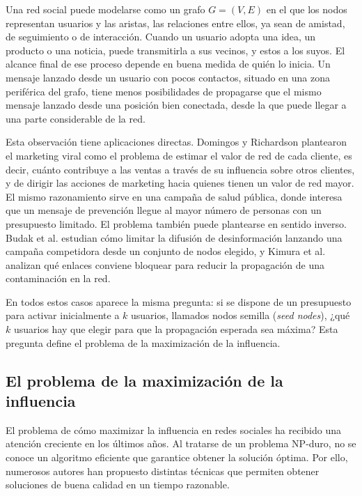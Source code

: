 \documentclass[12pt,twoside,titlepage]{report}
\begin{document}
Una red social puede modelarse como un grafo $G=(V,E)$ en el que los nodos representan usuarios y las aristas, las relaciones entre ellos, ya sean de amistad, de seguimiento o de interacción.
Cuando un usuario adopta una idea, un producto o una noticia, puede transmitirla a sus vecinos, y estos a los suyos.
El alcance final de ese proceso depende en buena medida de quién lo inicia.
Un mensaje lanzado desde un usuario con pocos contactos, situado en una zona periférica del grafo, tiene menos posibilidades de propagarse que el mismo mensaje lanzado desde una posición bien conectada, desde la que puede llegar a una parte considerable de la red.

Esta observación tiene aplicaciones directas.
Domingos y Richardson \cite{domingos2001mining} plantearon el marketing viral como el problema de estimar el valor de red de cada cliente, es decir, cuánto contribuye a las ventas a través de su influencia sobre otros clientes, y de dirigir las acciones de marketing hacia quienes tienen un valor de red mayor.
El mismo razonamiento sirve en una campaña de salud pública, donde interesa que un mensaje de prevención llegue al mayor número de personas con un presupuesto limitado.
El problema también puede plantearse en sentido inverso.
Budak et al. \cite{Budak2011} estudian cómo limitar la difusión de desinformación lanzando una campaña competidora desde un conjunto de nodos elegido, y Kimura et al. \cite{Kimura2009} analizan qué enlaces conviene bloquear para reducir la propagación de una contaminación en la red.

En todos estos casos aparece la misma pregunta: si se dispone de un presupuesto para activar inicialmente a $k$ usuarios, llamados nodos semilla (\textit{seed nodes}), ¿qué $k$ usuarios hay que elegir para que la propagación esperada sea máxima?
Esta pregunta define el problema de la maximización de la influencia.

\subsection{El problema de la maximización de la influencia} \label{subsec:problema_im}

El problema de cómo maximizar la influencia en redes sociales ha recibido una atención creciente en los últimos años.
Al tratarse de un problema NP-duro, no se conoce un algoritmo eficiente que garantice obtener la solución óptima.
Por ello, numerosos autores han propuesto distintas técnicas que permiten obtener soluciones de buena calidad en un tiempo razonable.
\end{document}
